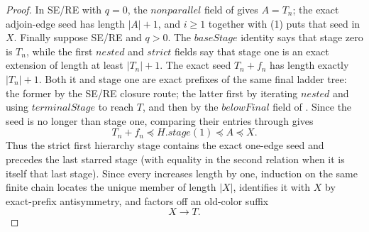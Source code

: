 \begin{proof}
In SE/RE with \(q=0\), the \(\mathit{nonparallel}\) field of
 gives \(A=T_n\); the exact adjoin-edge seed has
length \(|A|+1\), and \(i\ge1\) together with (1) puts that seed in
\(X\).  Finally suppose SE/RE and \(q>0\).  The
\(\mathit{baseStage}\) identity says that stage zero is \(T_n\), while
the first \(\mathit{nested}\) and \(\mathit{strict}\) fields say that
stage one is an exact extension of length at least \(|T_n|+1\).  The
exact seed \(T_n+f_n\) has length exactly \(|T_n|+1\).  Both it and
stage one are exact prefixes of the same final ladder tree: the former
by the SE/RE closure route; the latter first by iterating
\(\mathit{nested}\) and using \(\mathit{terminalStage}\) to reach
\(T\), and then by the \(\mathit{belowFinal}\) field of
.  Since the seed is no longer than stage
one, comparing their entries through
 gives
\[
             T_n+f_n\preccurlyeq H.\mathit{stage}(1)
                 \preccurlyeq A\preccurlyeq X.
\]
Thus the strict first hierarchy stage contains the exact one-edge seed
and precedes the last starred stage (with equality in the second relation
when it is itself that last stage).  Since every
 increases length by one, induction on the
same finite chain locates the unique member of length \(|X|\), identifies
it with \(X\) by exact-prefix antisymmetry, and factors off an old-color
suffix
\[
                         X\longrightarrow T.                 \tag{9}
\]


\end{proof}
